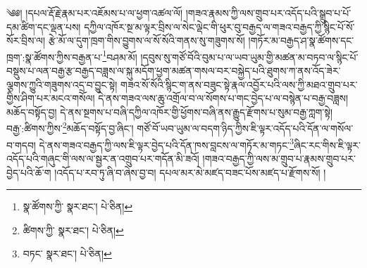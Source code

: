 \setcounter{footnote}{0} 
༄༅། །དཔལ་རྡོ་རྗེ་རྣམ་པར་འཇོམས་པ་ལ་ཕྱག་འཚལ་ལོ། །གཟའ་རྣམས་ཀྱི་ལས་གྲུབ་པར་འདོད་པའི་སྒྲུབ་པ་པོ་དམ་ཚིག་དང་ལྡན་པས། དཀྱིལ་འཁོར་སྔ་མ་ལྟར་བྲིས་ལ་སེང་ལྡེང་གི་ཕུར་བུ་བརྒྱད་ལ་གཟའ་བརྒྱད་ཀྱི་སྙིང་པོ་སོ་སོར་བྲིས་ལ། རྩེ་མོ་ལ་དུག་ཁྲག་གིས་བྱུགས་ལ་སོ་སོའི་གནས་སུ་གཟུགས་སོ། །གཏོར་མ་བརྒྱད་ཤ་སྣ་ཚོགས་དང་ཁྲག་:སྣ་ཚོགས་ཀྱིས་བརྒྱན་པ་\footnote{སྣ་ཚོགས་ཀྱི་  སྣར་ཐང་།  པེ་ཅིན། }བཤམ་མོ། །དབུས་སུ་གཙོ་བོའི་བུམ་པ་ལ་ཡབ་ཡུམ་གྱི་མཚན་མ་བཏབ་ལ་སྙིང་པོ་བསྡུས་པ་ལན་བརྒྱ་རྩ་བརྒྱད་བཟླས་ལ་སྐུ་མདོག་ཕྱག་མཚན་གསལ་བར་བསྐྱེད་པའི་ཐུགས་ཀ་ནས་འོད་ཟེར་ལྕགས་ཀྱུའི་གཟུགས་འདྲ་བ་བྱུང་སྟེ། གཟའ་སོ་སོའི་སྙིང་ག་ནས་བཟུང་སྟེ་རྣལ་འབྱོར་པའི་ལས་ཀྱི་མཐའ་གྲུབ་པར་གྱིས་ཤིག་པར་མངའ་གསོལ། དེ་ནས་གཟའ་ལས་ཆུ་འགྲོལ་བ་ལ་སོགས་པ་གང་བྱེད་པ་ལ་བསྙེན་པ་བརྒྱ་བཟླས། མཆོད་བསྟོད་བྱ། དེ་ནས་སྔགས་པ་བཞི་དཀྱིལ་འཁོར་གྱི་ཕྱོགས་བཞི་ནས་རྒྱུད་རྫོགས་པ་སུམ་བརྒྱ་ཀླག་སྟེ། བརྒྱ་:ཚིགས་ཀྱིས་\footnote{ཚིགས་ཀྱི་  སྣར་ཐང་།  པེ་ཅིན། }མཆོད་བསྟོད་བྱ་ཞིང་། གཙོ་བོ་ཡབ་ཡུམ་ལ་བདག་ཉིད་ཀྱིས་ཇི་ལྟར་འདོད་པའི་དོན་ལ་གསོལ་བ་གདབ། དེ་ནས་གཟའ་བརྒྱད་ཀྱི་ལས་ཇི་ལྟར་བྱེད་པའི་དོན་ཁས་བླངས་ལ་གཏོར་མ་གཏང་\footnote{བཏང་  སྣར་ཐང་།  པེ་ཅིན། }ཞིང་རང་གིས་ཇི་ལྟར་འདོད་པའི་གཞུང་གི་ལས་ལ་སྦྱར་ན་འགྲུབ་པར་གདོན་མི་ཟའོ། །གཟའ་བརྒྱད་ཀྱི་ལས་མ་གྲུབ་པ་རྣམས་གྲུབ་པར་བྱེད་པའི་ཆོ་ག །འདོད་པ་རབ་ཏུ་ཞི་བ་ཞེས་བྱ་བ། དཔལ་མར་མེ་མཛད་བཟང་པོས་མཛད་པ་རྫོགས་སོ། ། 